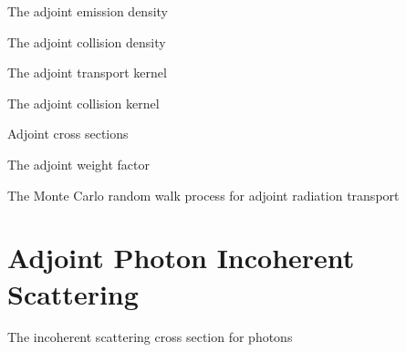 \documentclass{beamer}
\begin{document}
\begin{frame}{The adjoint emission density}

\end{frame}

\begin{frame}{The adjoint collision density}

\end{frame}

\begin{frame}{The adjoint transport kernel}

\end{frame}

\begin{frame}{The adjoint collision kernel}

\end{frame}

\begin{frame}{Adjoint cross sections}

\end{frame}

\begin{frame}{The adjoint weight factor}

\end{frame}

\begin{frame}{The Monte Carlo random walk process for adjoint radiation transport}

\end{frame}

\section{Adjoint Photon Incoherent Scattering}
\begin{frame}{The incoherent scattering cross section for photons}

\end{frame}
\end{document}
